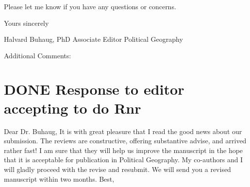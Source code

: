 \documentclass{article}
\begin{document}
Please let me know if you have any questions or concerns.

Yours sincerely

Halvard Buhaug, PhD
Associate Editor
Political Geography





Additional Comments:

\section{{\bfseries\sffamily DONE} Response to editor accepting to do Rnr}
\label{sec:orgheadline2}
Dear Dr. Buhaug, 
It is with great pleasure that I read the good news about our submission. The reviews are constructive, offering substantive advise, and arrived rather fast! I am sure that they will help us improve the manuscript in the hope that it is acceptable for publication in Political Geography. My co-authors and I will gladly proceed with the revise and resubmit. We will send you a revised manuscript within two months. 
Best,
\end{document}
